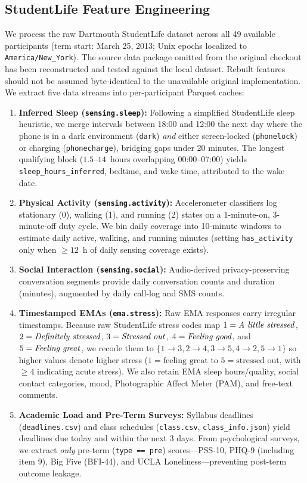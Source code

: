\documentclass{article}
\begin{document}
\subsection{StudentLife Feature Engineering}
We process the raw Dartmouth StudentLife dataset \cite{wang2014studentlife} across all 49 available participants (term start: March 25, 2013; Unix epochs localized to \texttt{America/New\_York}). The source data package omitted from the original checkout has been reconstructed and tested against the local dataset. Rebuilt features should not be assumed byte-identical to the unavailable original implementation. We extract five data streams into per-participant Parquet caches:
\begin{enumerate}
  \item \textbf{Inferred Sleep (\texttt{sensing.sleep}):} Following a simplified StudentLife sleep heuristic, we merge intervals between 18:00 and 12:00 the next day where the phone is in a dark environment (\texttt{dark}) \emph{and} either screen-locked (\texttt{phonelock}) or charging (\texttt{phonecharge}), bridging gaps under 20 minutes. The longest qualifying block ($1.5\text{--}14$~hours overlapping 00:00--07:00) yields \texttt{sleep\_hours\_inferred}, bedtime, and wake time, attributed to the wake date.
  \item \textbf{Physical Activity (\texttt{sensing.activity}):} Accelerometer classifiers log stationary (0), walking (1), and running (2) states on a 1-minute-on, 3-minute-off duty cycle. We bin daily coverage into 10-minute windows to estimate daily active, walking, and running minutes (setting \texttt{has\_activity} only when $\ge 12$~h of daily sensing coverage exists).
  \item \textbf{Social Interaction (\texttt{sensing.social}):} Audio-derived privacy-preserving conversation segments provide daily conversation counts and duration (minutes), augmented by daily call-log and SMS counts.
  \item \textbf{Timestamped EMAs (\texttt{ema.stress}):} Raw EMA responses carry irregular timestamps. Because raw StudentLife stress codes map $1=\text{\emph{A little stressed}}$, $2=\text{\emph{Definitely stressed}}$, $3=\text{\emph{Stressed out}}$, $4=\text{\emph{Feeling good}}$, and $5=\text{\emph{Feeling great}}$, we recode them to $\{1\to 3, 2\to 4, 3\to 5, 4\to 2, 5\to 1\}$ so higher values denote higher stress ($1=\text{feeling great}$ to $5=\text{stressed out}$, with $\ge 4$ indicating acute stress). We also retain EMA sleep hours/quality, social contact categories, mood, Photographic Affect Meter (PAM), and free-text comments.
  \item \textbf{Academic Load and Pre-Term Surveys:} Syllabus deadlines (\texttt{deadlines.csv}) and class schedules (\texttt{class.csv}, \texttt{class\_info.json}) yield deadlines due today and within the next 3 days. From psychological surveys, we extract \emph{only} pre-term (\texttt{type == pre}) scores---PSS-10, PHQ-9 (including item 9), Big Five (BFI-44), and UCLA Loneliness---preventing post-term outcome leakage.
\end{enumerate}
\end{document}
